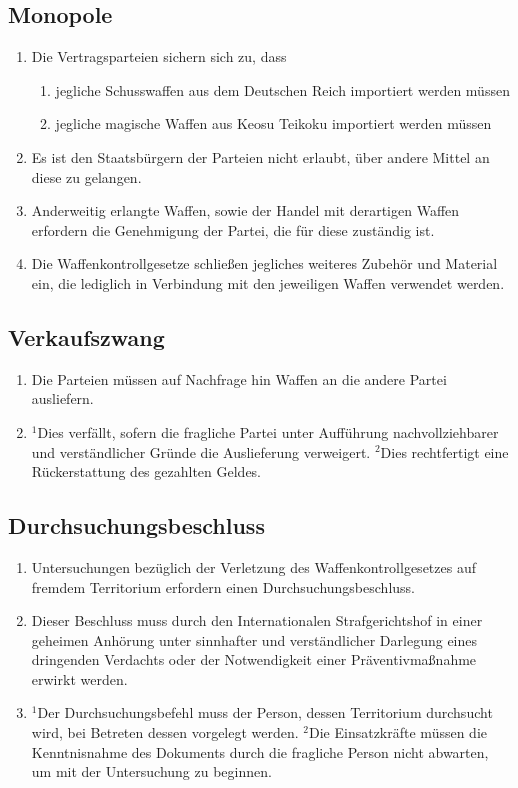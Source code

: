 \documentclass{article}
\begin{document}
\subsection{Monopole}
\begin{enumerate}[(1)]
    \item Die Vertragsparteien sichern sich zu, dass
    \begin{enumerate}[1.]
        \item jegliche Schusswaffen aus dem Deutschen Reich importiert werden müssen
        \item jegliche magische Waffen aus Keosu Teikoku importiert werden müssen
    \end{enumerate}
    \item Es ist den Staatsbürgern der Parteien nicht erlaubt, über andere Mittel an diese zu gelangen.
    \item Anderweitig erlangte Waffen, sowie der Handel mit derartigen Waffen erfordern die Genehmigung der Partei, die für diese zuständig ist.
    \item Die Waffenkontrollgesetze schließen jegliches weiteres Zubehör und Material ein, die lediglich in Verbindung mit den jeweiligen Waffen verwendet werden.
\end{enumerate}

\subsection{Verkaufszwang}
\begin{enumerate}[(1)]
    \item Die Parteien müssen auf Nachfrage hin Waffen an die andere Partei ausliefern.
    \item ${^1}$Dies verfällt, sofern die fragliche Partei unter Aufführung nachvollziehbarer und verständlicher Gründe die Auslieferung verweigert. ${^2}$Dies rechtfertigt eine Rückerstattung des gezahlten Geldes.
\end{enumerate}

\subsection{Durchsuchungsbeschluss}
\begin{enumerate}[(1)]
    \item Untersuchungen bezüglich der Verletzung des Waffenkontrollgesetzes auf fremdem Territorium erfordern einen Durchsuchungsbeschluss.
    \item Dieser Beschluss muss durch den Internationalen Strafgerichtshof in einer geheimen Anhörung unter sinnhafter und verständlicher Darlegung eines dringenden Verdachts oder der Notwendigkeit einer Präventivmaßnahme erwirkt werden.
    \item ${^1}$Der Durchsuchungsbefehl muss der Person, dessen Territorium durchsucht wird, bei Betreten dessen vorgelegt werden. ${^2}$Die Einsatzkräfte müssen die Kenntnisnahme des Dokuments durch die fragliche Person nicht abwarten, um mit der Untersuchung zu beginnen.
\end{enumerate}
\end{document}
